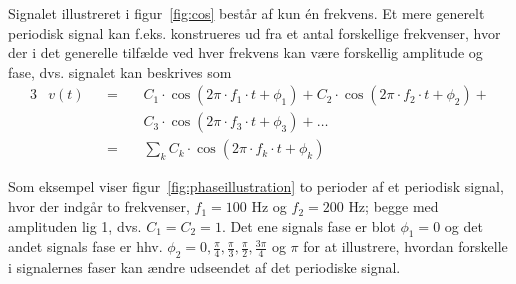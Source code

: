 \documentclass[11pt,a4paper]{article}
\begin{document}
Signalet illustreret i figur~\ref{fig:cos} består af kun én frekvens. Et mere generelt periodisk signal kan f.eks. konstrueres ud fra et antal forskellige frekvenser, hvor der i det generelle tilfælde ved hver frekvens kan være forskellig amplitude og fase, dvs. signalet kan beskrives som
\begin{alignat}{3}\label{eq:periodic2}
& v(t) && =\ && C_{1}\cdot{}\cos(2\pi\cdot{}f_{1}\cdot{}t+\phi_{1}) + C_{2}\cdot{}\cos(2\pi\cdot{}f_{2}\cdot{}t+\phi_{2}) + \nonumber\\ 
& &&\ && C_{3}\cdot{}\cos(2\pi\cdot{}f_{3}\cdot{}t+\phi_{3}) + \ldots\nonumber \\
& && =\ && \sum_{k} C_{k}\cdot{}\cos(2\pi\cdot{}f_{k}\cdot{}t+\phi_{k})
\end{alignat}

Som eksempel viser figur~\ref{fig:phaseillustration} to perioder af et periodisk signal, hvor der indgår to frekvenser, $f_{1}=100\textrm{ Hz}$ og $f_{2}=200\textrm{ Hz}$; begge med amplituden lig 1, dvs. $C_{1}=C_{2}=1$. Det ene signals fase er blot $\phi_{1}=0$ og det andet signals fase er hhv. $\phi_{2}=0,\frac{\pi}{4},\frac{\pi}{3},\frac{\pi}{2},\frac{3\pi}{4}$ og $\pi$ for at illustrere, hvordan forskelle i signalernes faser kan ændre udseendet af det periodiske signal.
\end{document}
